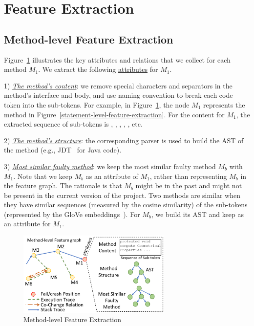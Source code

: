 \section{Feature Extraction}
\label{feature-extract:sec}




\subsection{Method-level Feature Extraction}

Figure~\ref{method-level-feature-extraction} illustrates the key
attributes and relations that we collect for each method $M_1$. We
extract the following \underline{attributes} for
$M_1$.

1) {\em \underline{The method's content}}: we remove special
characters and separators in the method's interface and body, and use
naming convention to break each code token into the sub-tokens. For
example, in Figure~\ref{method-level-feature-extraction}, the node
$M_1$ represents the method  in
Figure~\ref{statement-level-feature-extraction}. For the content for
$M_1$, the extracted sequence of sub-tokens is ,
, , , ,
etc.

2) {\em \underline{The method's structure}}: the corresponding parser
is used to build the AST of the method (e.g., JDT~\cite{JDT} for Java
code).


3) {\em \underline{Most similar faulty method}}: we keep the most
similar faulty method $M_b$ with $M_1$. Note that we keep $M_b$ as an
attribute of $M_1$, rather than representing $M_b$ in the feature
graph. The rationale is that $M_b$ might be in the past and might not
be present in the current version of the project. Two methods are
similar when they have similar sequences (measured by the cosine
similarity) of the sub-tokens (represented by the GloVe
embeddings~\cite{glove2014}).  For $M_b$, we build its AST and
keep as an attribute for $M_1$.

  \begin{figure}[t]
	\centering
	\includegraphics[width=3in]{graphs/step-1-method.png}
        \vspace{-6pt}
        \caption{Method-level Feature Extraction}
	\label{method-level-feature-extraction}
\end{figure}

